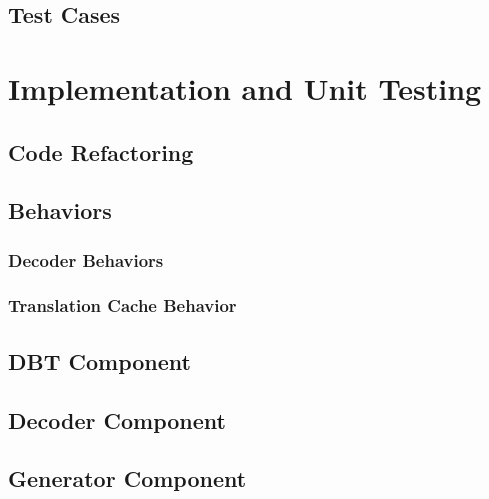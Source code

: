 \documentclass[12pt]{article}
\newcounter{subsubsubsection}[subsubsection]
\begin{document}
\subsection{Test Cases}


\newpage
\section{Implementation and Unit Testing}


\subsection{Code Refactoring}


\subsection{Behaviors}
\subsubsection{Decoder Behaviors}


\subsubsection{Translation Cache Behavior}
					





\subsection {DBT Component}

\subsection{Decoder Component}

\subsection{Generator Component}

\newpage
\end{document}
